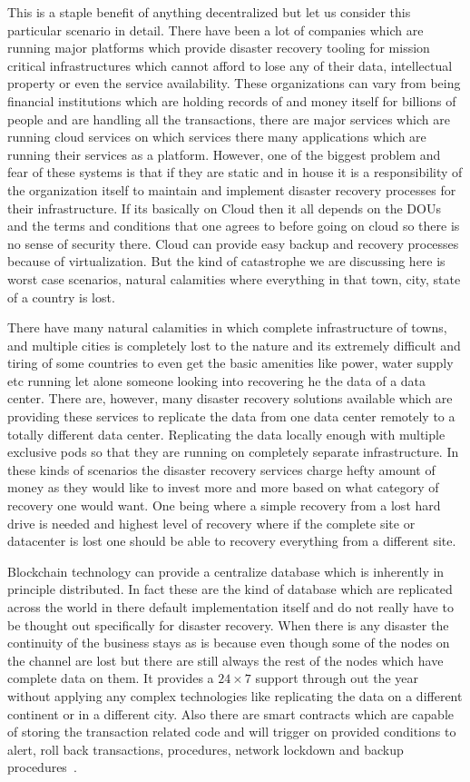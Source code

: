 This is a staple benefit of anything decentralized but let us consider
this particular scenario in detail. There have been a lot of companies
which are running major platforms which provide disaster recovery
tooling for mission critical infrastructures which cannot afford to
lose any of their data, intellectual property or even the service
availability. These organizations can vary from being financial
institutions which are holding records of and money itself for
billions of people and are handling all the transactions, there are
major services which are running cloud services on which services
there many applications which are running their services as a
platform. However, one of the biggest problem and fear of these
systems is that if they are static and in house it is a responsibility
of the organization itself to maintain and implement disaster recovery
processes for their infrastructure. If its basically on Cloud then it
all depends on the DOUs and the terms and conditions that one agrees
to before going on cloud so there is no sense of security there. Cloud
can provide easy backup and recovery processes because of
virtualization. But the kind of catastrophe we are discussing here is
worst case scenarios, natural calamities where everything in that
town, city, state of a country is lost.

There have many natural calamities in which complete infrastructure of
towns, and multiple cities is completely lost to the nature and its
extremely difficult and tiring of some countries to even get the basic
amenities like power, water supply etc running let alone someone
looking into recovering he the data of a data center. There are,
however, many disaster recovery solutions available which are
providing these services to replicate the data from one data center
remotely to a totally different data center. Replicating the data
locally enough with multiple exclusive pods so that they are running
on completely separate infrastructure. In these kinds of scenarios the
disaster recovery services charge hefty amount of money as they would like
to invest more and more based on what category of recovery one would
want. One being where a simple recovery from a lost hard drive is
needed and highest level of recovery where if the complete site or
datacenter is lost one should be able to recovery everything from a
different site.

Blockchain technology can provide a centralize database which is
inherently in principle distributed. In fact these are the kind of
database which are replicated across the world in there default
implementation itself and do not really have to be thought out
specifically for disaster recovery. When there is any disaster the
continuity of the business stays as is because even though some of the
nodes on the channel are lost but there are still always the rest of
the nodes which have complete data on them. It provides a
$24 \times 7$ support through out the year without applying any
complex technologies like replicating the data on a different
continent or in a different city. Also there are smart contracts which
are capable of storing the transaction related code and will trigger
on provided conditions to alert, roll back transactions, procedures,
network lockdown and backup procedures~\cite{elmer7}.

